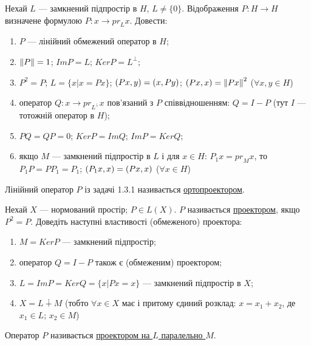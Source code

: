 
\begin{exercise}
    Нехай $L$ --- замкнений підпростір в $H$, $L \neq \{0\}$. 
    Відображення $P: H \rightarrow H$ визначене формулою 
    $P: x \rightarrow {pr}_L x$. Довести:
    \begin{enumerate}[label=\ukr*)]
        \item $P$ --- лінійний обмежений оператор в $H$;
        \item $\left\lVert P\right\rVert = 1$; $ImP = L$; $Ker P = L^\bot$;
        \item $P^2 = P$; $L = \{x|x=Px\}$; $\left(Px, y\right)=\left(x, Py\right)$;
        $\left(Px, x\right) = \left\lVert Px\right\rVert^2$ ($\forall x,y \in H$)
        \item оператор $Q: x \rightarrow {pr}_{L^\bot}x$ пов'язаний з $P$ 
        співвідношенням: $Q = I-P$ (тут $I$ --- тотожній оператор в $H$);
        \item $PQ = QP = 0$; $KerP = ImQ$; $ImP = KerQ$;
        \item якщо $M$ --- замкнений підпростір в $L$ і для $x \in H$:
        $P_1 x = {pr}_M x$, то $P_1 P = P P_1 = P_1$; 
        $\left(P_1x, x\right) = \left(Px, x\right)$ ($\forall x \in H$)
    \end{enumerate}
\end{exercise}

\begin{theory}
    Лінійний оператор $P$ із задачі 1.3.1 називається \uline{ортопроектором}.
\end{theory}

\begin{exercise}
    Нехай $X$ --- нормований простір; $P \in L(X)$.
    $P$ називається \uline{проектором}, якщо $P^2=P$. Доведіть наступні 
    властивості (обмеженого) проектора:
    \begin{enumerate}[label=\ukr*)]
        \item $M = KerP$ --- замкнений підпростір;
        \item оператор $Q = I - P$ також є (обмеженим) проектором;
        \item $L=ImP=KerQ=\{x|Px=x\}$ --- замкнений підпростір в $X$;
        \item $X = L \dotplus M$ (тобто $\forall x \in X$ має і притому 
        єдиний розклад: $x=x_1+x_2$, де $x_1 \in L$; $x_2 \in M$)
    \end{enumerate}
\end{exercise}

\begin{theory}
    Оператор $P$ називається \uline{проектором на $L$ паралельно $M$}.
\end{theory}

